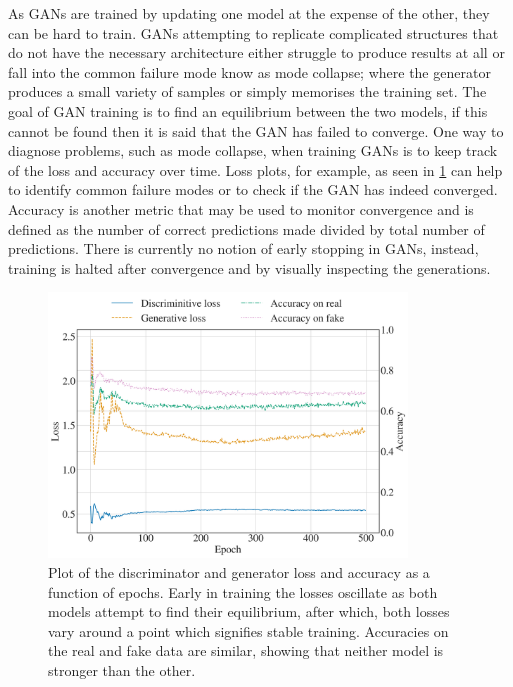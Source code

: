 \documentclass[12pt]{iopart}
\begin{document}
As \acp{GAN} are trained by updating one model at the expense of the other, they can be hard to train. GANs attempting to replicate complicated structures that do not
have the necessary architecture either struggle to produce results at all or
fall into the common failure mode know as mode collapse; where the generator
produces a small variety of samples or simply memorises the training set. The goal of \ac{GAN} training is to find an equilibrium between the two models, if this cannot be found then it is said that the \ac{GAN} has failed to converge. One way to diagnose problems, such as mode collapse, when training \acp{GAN} is to keep track of the loss and accuracy over time. Loss plots, for example, as seen in \cref{fig:lossplot} can help to identify common failure modes or to check if the \ac{GAN} has indeed converged. Accuracy is another metric that may be used to monitor convergence and is defined as the number of correct predictions made divided by total number of predictions. There is currently no notion of early stopping in \acp{GAN}, instead, training is halted after convergence and by visually inspecting the generations. 
\begin{figure}[h!]
    \centering
    \includegraphics[width=0.85\textwidth]{figures/losses.png}
    \caption{Plot of the discriminator and generator loss and accuracy as a function of epochs. Early in training the losses oscillate as both models attempt to find their equilibrium, after which, both losses vary around a point which signifies stable training. Accuracies on the real and fake data are similar, showing that neither model is stronger than the other.}
    \label{fig:lossplot}
\end{figure}

\end{document}
